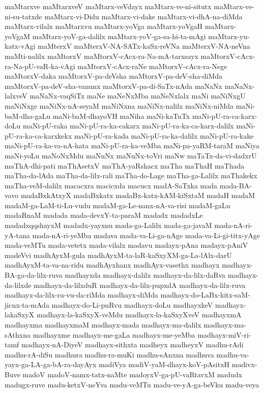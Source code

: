 {maMtarxve
maMtarxveV
maMtarx-veVdayx
maMtarx-ve-ni-situtx
maMtarx-ve-ni-su-tatxde
maMtarx-vi-Didu
maMtarx-vi-dake
maMtarx-vi-dhA-na-diMda
maMtarx-vilalx
maMtarxvu
maMtarx-yoVga
maMtarx-yoVgaH
maMtarx-yoVgaM
maMtarx-yoV-ga-dalilx
maMtarx-yoV-ga-sa-hi-ta-mAgi
maMtarx-yu-katx-vAgi
maMterxV
maMterxV-NA-SATx-kaSx-reVNa
maMterxV-NA-neVna
maMti-nalilx
maMtorxV
maMtorxV-cAcx-ra-Na-mA-tarxsayx
maMtorxV-cAcx-ra-Na-pU-vaR-ka-vAgi
maMtorxV-cAcx-raNe
maMtorxV-cAcx-ra-Nege
maMtorxV-daka
maMtorxV-pa-deVsha
maMtorxV-pa-deV-sha-diMda
maMtorxV-pa-deV-sha-vanunx
maMtorxV-pa-di-SaTx-nAda
maNaNx
maNaNx-lalxveV
maNaNx-vaqSiTx
maNe
maNeNxMba
maNeNxlalx
maNi
maNiNxgU
maNiNxge
maNiNx-nA-seyaM
maNiNxna
maNiNx-nalilx
maNiNx-niMda
maNi-baM-dha-gaLu
maNi-baM-dhayoVH
maNiha
maNi-kaTuTx
maNi-pU-ra-ca-karx-doLu
maNi-pU-raka
maNi-pU-ra-ka-cakarx
maNi-pU-ra-ka-ca-karx-dalilx
maNi-pU-ra-ka-ca-karxkekx
maNi-pU-ra-kada
maNi-pU-ra-ka-dalilx
maNi-pU-ra-kake
maNi-pU-ra-ka-va-nA-hata
maNi-pU-ra-ka-veMba
maNi-pa-yaRM-taraM
maNiya
maNi-yoLu
maNoNxMdu
maNuNx
maNuNx-toVri
maNw
maTaTx-da-vi-dadxrU
maThA-dhi-pati
maThAsetxV
maThA-yaRshacx
maTha
maThaH
maThada
maTha-da-lAda
maTha-da-lilx-rali
maTha-do-Lage
maTha-ga-Lalilx
maThakekx
maTha-veM-dalilx
macacxra
macicxda
macucx
madA-SaTxka
mada
mada-BA-vavo
madaBxkAtxyX
madaBxkatx
madaBx-katx-kAM-kiSxtaM
madaH
madaM
madaM-ga-LaM-ti-Lu-vudu
madaM-ga-Le-nanx-nA-va-risi
madaM-gaLu
madaRnaM
madada
mada-devxY-ta-paraM
madadx
madadxLe
madadxqqshayxM
madadx-yayxnu
mada-ga-Lalilx
mada-ga-javaM
mada-nA-ri-yA-tana
mada-nA-ri-yeMba
madava
mada-va-Li-ga-nAge
mada-va-Li-gi-titx-yAge
mada-veMTu
mada-vetetx
mada-vilalx
madavu
madayx-pAna
madayx-pAniV
madeVvi
madhAyxM-gula
madhAyxM-ta-laR-kaSxyXM-ga-La-lAlx-darU
madhAyxM-ta-va-na-ridu
madhAyxhanx
madhAyx-vasethx
madhayx
madhayx-BA-ga-da-lilx-ruva
madhayxda
madhayx-dalilx
madhayx-da-lilx-daRva
madhayx-da-lilxde
madhayx-da-lilxduR
madhayx-da-lilx-pupxdA
madhayx-da-lilx-ruva
madhayx-da-lilx-ru-vu-da-riMda
madhayx-diMda
madhayx-do-LaBx-kitx-saM-jicnx-ta-mAda
madhayx-do-Li-puRvu
madhayx-doLu
madhayxkeV
madhayx-lakaSxyX
madhayx-la-kaSxyX-veMdu
madhayx-la-kaSxyXveV
madhayxmA
madhayxma
madhayxmaM
madhayx-mada
madhayx-ma-dalilx
madhayx-ma-sAthxna
madhayxme
madhayx-me-gaLa
madhayx-me-yeMba
madhayx-miV-ri-tamf
madhayx-nA-DiyeV
madhayx-sithxta
madheyx
madheyxV
madhu-rAdi
madhu-rA-diSu
madhura
madhu-ra-muKi
madhu-sAnxna
madhuva
madhu-va-yayx-ga-LA-ga-bA-ra-dayAyx
madiVya
madiV-yaM-dhayx-koV-pAsitxH
madivx-Buve
madoV
madoV-namx-tatx-naMte
madoyxV-ga-pU-vaRtavxM
madudx
madugx-ruve
madu-ketxV-neYva
madu-veMTu
madu-ve-yA-ga-beVku
madu-veya
}
